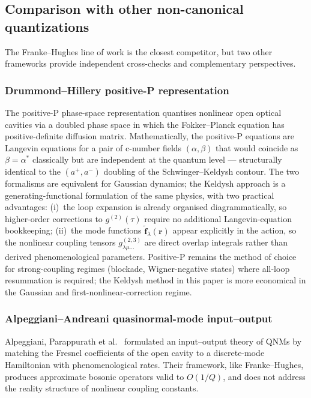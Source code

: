 \documentclass[12pt]{article}
\newcommand{\tf}{\tilde{\mathbf{f}}}
\begin{document}
\subsection{Comparison with other non-canonical quantizations}
\label{sec:other_comparisons}

The Franke--Hughes line of work is the closest competitor, but two
other frameworks provide independent cross-checks and complementary
perspectives.

\subsubsection*{Drummond--Hillery positive-P representation}

The positive-P phase-space representation
\cite{Drummond1980,DrummondHillery2014} quantises nonlinear open optical
cavities via a doubled phase space in which the Fokker--Planck equation
has positive-definite diffusion matrix.  Mathematically, the positive-P
equations are Langevin equations for a pair of c-number fields
$(\alpha,\beta)$ that would coincide as $\beta=\alpha^*$ classically but
are independent at the quantum level --- structurally identical to the
$(a^+,a^-)$ doubling of the Schwinger--Keldysh contour.  The two
formalisms are equivalent for Gaussian dynamics; the Keldysh approach is
a generating-functional formulation of the same physics, with two
practical advantages: (i)~the loop expansion is already organised
diagrammatically, so higher-order corrections to $g^{(2)}(\tau)$ require
no additional Langevin-equation bookkeeping; (ii)~the mode functions
$\tf_\lambda(\mathbf{r})$ appear explicitly in the action, so the
nonlinear coupling tensors $g^{(2,3)}_{\lambda\mu\ldots}$ are direct
overlap integrals rather than derived phenomenological parameters.
Positive-P remains the method of choice for strong-coupling regimes
(blockade, Wigner-negative states) where all-loop resummation is
required; the Keldysh method in this paper is more economical in the
Gaussian and first-nonlinear-correction regime.

\subsubsection*{Alpeggiani--Andreani quasinormal-mode input--output}
\label{sec:AA_derivation}

Alpeggiani, Parappurath et al.\ \cite{Alpeggiani2015,Alpeggiani2017}
formulated an input--output theory of QNMs by matching the Fresnel
coefficients of the open cavity to a discrete-mode Hamiltonian with
phenomenological rates.  Their framework, like Franke--Hughes, produces
approximate bosonic operators valid to $O(1/Q)$, and does not address
the reality structure of nonlinear coupling constants.
\end{document}
